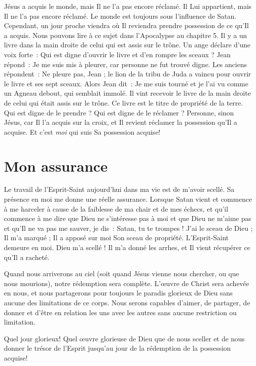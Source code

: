 Jésus a acquis le monde, mais Il ne l'a pas encore réclamé.
 Il Lui appartient, mais Il ne l'a pas encore réclamé.
 Le monde est toujours sous l'influence de Satan.
 Cependant, un jour proche viendra où Il reviendra prendre possession
 de ce qu'Il a acquis.
 Nous pouvons lire à ce sujet dans l'Apocalypse au chapitre 5.
 Il y a un livre dans la main droite de celui qui est assis sur le trône.
 Un ange déclare d'une voix forte~:
 \og Qui est digne d'ouvrir le livre et d'en rompre les sceaux ? \og
 Jean répond~: \og Je me suis mis à pleurer,
 car personne ne fut trouvé digne. \fg{}
 Les anciens répondent~: \og Ne pleure pas, Jean ;
 le lion de la tribu de Juda a vaincu pour ouvrir
 le livre et ses sept sceaux. \fg{}
 Alors Jean dit~: \og Je me suis tourné et je l'ai vu comme un Agneau debout,
 qui semblait immolé. Il vint recevoir le livre de la main droite
 de celui qui était assis sur le trône. \fg{}
 Ce livre est le titre de propriété de la terre.
 Qui est digne de le prendre ? Qui est digne de le réclamer ?
 Personne, sinon Jésus, car Il l'a acquis sur la croix, et Il revient
 réclamer la possession qu'Il a acquise.
 Et c'est \emph{moi} qui suis Sa possession acquise!


\section*{Mon assurance}

Le travail de l'Esprit-Saint aujourd'hui dans ma vie est de m'avoir scellé.
 Sa présence en moi me donne une réelle assurance.
 Lorsque Satan vient et commence à me harceler à cause de la faiblesse
 de ma chair et de mes échecs, et qu'il commence à me dire que Dieu
 ne s'intéresse pas à moi et que Dieu ne m'aime pas et qu'Il ne va pas
 me sauver, je dis~:
 \og Satan, tu te trompes ! J'ai le sceau de Dieu ; Il m'a marqué ;
 Il a apposé sur moi Son sceau de propriété. L'Esprit-Saint demeure en moi.
 Dieu m'a scellé ! Il m'a donné les arrhes, et Il vient récupérer
 ce qu'Il a racheté. \fg{}

Quand nous arriverons au ciel (soit quand Jésus vienne nous chercher,
 ou que nous mourions), notre rédemption sera complète.
 L'œuvre de Christ sera achevée en nous, et nous partagerons pour
 toujours le paradis glorieux de Dieu sans aucune des limitations
 de ce corps. Nous serons capables d'aimer, de partager, de donner
 et d'être en relation les uns avec les autres sans aucune restriction
 ou limitation.

Quel jour glorieux! Quel œuvre glorieuse de Dieu que de nous sceller
 et de nous donner le trésor de l'Esprit jusqu'au jour de la rédemption
 de la possession acquise!


